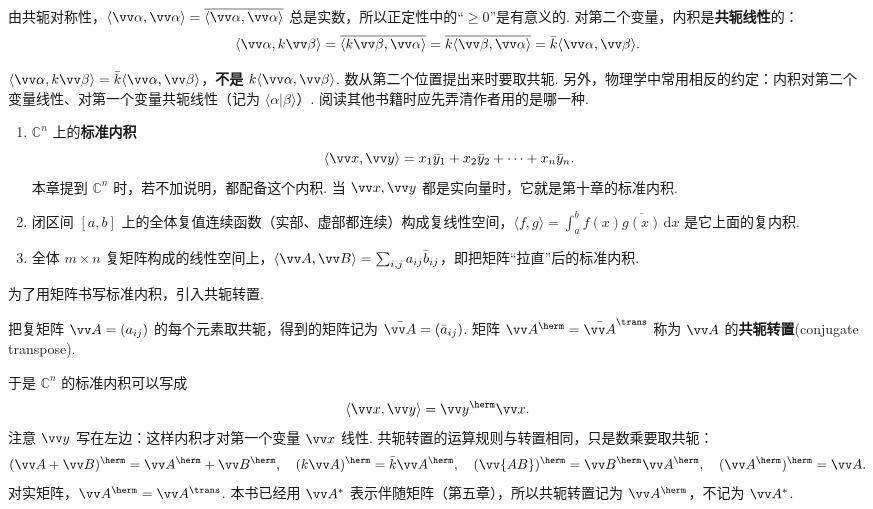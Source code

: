 	由共轭对称性，$\langle\vv\alpha,\vv\alpha\rangle=\overline{\langle\vv\alpha,\vv\alpha\rangle}$ 总是实数，所以正定性中的“$\ge0$”是有意义的. 对第二个变量，内积是\textbf{共轭线性}的：
	\[\langle\vv\alpha,k\vv\beta\rangle=\overline{\langle k\vv\beta,\vv\alpha\rangle}=\overline{k\langle\vv\beta,\vv\alpha\rangle}=\bar k\langle\vv\alpha,\vv\beta\rangle.\]
	
	\begin{pitfallbox}
		$\langle\vv\alpha,k\vv\beta\rangle=\bar k\langle\vv\alpha,\vv\beta\rangle$，\textbf{不是} $k\langle\vv\alpha,\vv\beta\rangle$. 数从第二个位置提出来时要取共轭. 另外，物理学中常用相反的约定：内积对第二个变量线性、对第一个变量共轭线性（记为 $\langle\alpha|\beta\rangle$）. 阅读其他书籍时应先弄清作者用的是哪一种.
	\end{pitfallbox}
	
	\begin{example}
		\begin{enumerate}
			\item $\mathbb{C}^n$ 上的\textbf{标准内积}
			\[\langle\vv x,\vv y\rangle=x_1\bar y_1+x_2\bar y_2+\cdots+x_n\bar y_n.\]
			本章提到 $\mathbb{C}^n$ 时，若不加说明，都配备这个内积. 当 $\vv x,\vv y$ 都是实向量时，它就是第十章的标准内积.
			\item 闭区间 $[a,b]$ 上的全体复值连续函数（实部、虚部都连续）构成复线性空间，$\langle f,g\rangle=\int_a^bf(x)\overline{g(x)}\,\mathrm dx$ 是它上面的复内积.
			\item 全体 $m\times n$ 复矩阵构成的线性空间上，$\langle\vv A,\vv B\rangle=\sum_{i,j}a_{ij}\bar b_{ij}$，即把矩阵“拉直”后的标准内积.
		\end{enumerate}
	\end{example}
	
	为了用矩阵书写标准内积，引入共轭转置.
	
	\begin{definition}
		把复矩阵 $\vv A=(a_{ij})$ 的每个元素取共轭，得到的矩阵记为 $\bar{\vv A}=(\bar a_{ij})$. 矩阵 $\vv A^\herm=\bar{\vv A}^\trans$ 称为 $\vv A$ 的\textbf{共轭转置}(conjugate transpose).
	\end{definition}
	
	于是 $\mathbb{C}^n$ 的标准内积可以写成
	\[\langle\vv x,\vv y\rangle=\vv y^\herm\vv x.\]
	注意 $\vv y$ 写在左边：这样内积才对第一个变量 $\vv x$ 线性. 共轭转置的运算规则与转置相同，只是数乘要取共轭：
	\[(\vv A+\vv B)^\herm=\vv A^\herm+\vv B^\herm,\quad(k\vv A)^\herm=\bar k\vv A^\herm,\quad(\vv{AB})^\herm=\vv B^\herm\vv A^\herm,\quad(\vv A^\herm)^\herm=\vv A.\]
	对实矩阵，$\vv A^\herm=\vv A^\trans$. 本书已经用 $\vv A^*$ 表示伴随矩阵（第五章），所以共轭转置记为 $\vv A^\herm$，不记为 $\vv A^*$.
	
